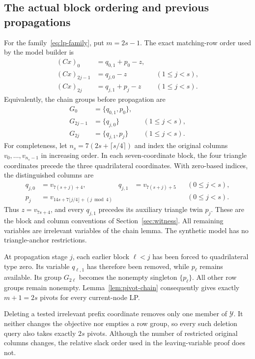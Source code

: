 \subsection{The actual block ordering and previous propagations}

For the family~\eqref{eq:lp-family}, put $m=2s-1$. The exact matching-row
order used by the model builder is
\begin{align*}
 (Cx)_0&=q_{0,1}+p_0-z,\\
 (Cx)_{2j-1}&=q_{j,0}-z &&(1\le j<s),\\
 (Cx)_{2j}&=q_{j,1}+p_j-z &&(1\le j<s).
\end{align*}
Equivalently, the chain groups before propagation are
\begin{align*}
 G_0&=\{q_{0,1},p_0\},\\
 G_{2j-1}&=\{q_{j,0}\} &&(1\le j<s),\\
 G_{2j}&=\{q_{j,1},p_j\} &&(1\le j<s).
\end{align*}
For completeness, let $n_s=7(2s+\lceil s/4\rceil)$ and index the original
columns $v_0,\ldots,v_{n_s-1}$ in increasing order. In each seven-coordinate
block, the four triangle coordinates precede the three quadrilateral
coordinates. With zero-based indices, the distinguished columns are
\begin{align*}
 q_{j,0}&=v_{7(s+j)+4},&
 q_{j,1}&=v_{7(s+j)+5} &&(0\le j<s),\\
 p_j&=v_{14s+7\lfloor j/4\rfloor+(j\bmod4)}
 &&&&(0\le j<s).
\end{align*}
Thus $z=v_{7s+4}$, and every $q_{j,1}$ precedes its auxiliary triangle
twin $p_j$. These are the block and column conventions of
Section~\ref{sec:witness}. All remaining variables are irrelevant
variables of the chain lemma. The synthetic model has no triangle-anchor
restrictions.

At propagation stage $j$, each earlier block $\ell<j$ has been forced to
quadrilateral type zero. Its variable $q_{\ell,1}$ has therefore been
removed, while $p_\ell$ remains available. Its group $G_{2\ell}$ becomes
the nonempty singleton $\{p_\ell\}$. All other row groups remain nonempty.
Lemma~\ref{lem:pivot-chain} consequently gives exactly
$m+1=2s$ pivots for every current-node LP.

Deleting a tested irrelevant prefix coordinate removes only one member of
$\mathcal Y$. It neither changes the objective nor empties a row group,
so every such deletion query also takes exactly $2s$ pivots. Although the
number of restricted original columns changes, the relative slack order
used in the leaving-variable proof does not.

